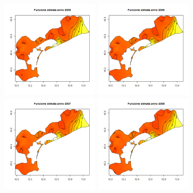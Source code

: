 \documentclass[a4paper,11pt,twoside,openright]{book}							%
\begin{document}
\newpage
\begin{figure}[H]
	\centering
	\includegraphics[width=0.43\textwidth ,height=0.235\textheight]{Immagini/venezia_con_covariate/Anno2005.png}
	\includegraphics[width=0.43\textwidth ,height=0.235\textheight]{Immagini/venezia_con_covariate/Anno2006.png}
	\includegraphics[width=0.43\textwidth ,height=0.235\textheight]{Immagini/venezia_con_covariate/Anno2007.png}
	\includegraphics[width=0.43\textwidth ,height=0.235\textheight]{Immagini/venezia_con_covariate/Anno2008.png}

\end{figure}
\end{document}
